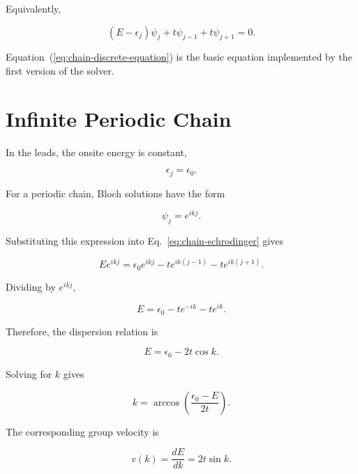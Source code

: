 Equivalently,

\begin{equation}
	(E-\epsilon_j)\psi_j
	+
	t\psi_{j-1}
	+
	t\psi_{j+1}
	=
	0.
	\label{eq:chain-discrete-equation}
\end{equation}

Equation~(\ref{eq:chain-discrete-equation}) is the basic equation
implemented by the first version of the solver.

\section{Infinite Periodic Chain}

In the leads, the onsite energy is constant,

\begin{equation}
	\epsilon_j=\epsilon_0.
\end{equation}

For a periodic chain, Bloch solutions have the form

\begin{equation}
	\psi_j = e^{ikj}.
\end{equation}

Substituting this expression into Eq.~\eqref{eq:chain-schrodinger}
gives

\begin{equation}
	E e^{ikj}
	=
	\epsilon_0 e^{ikj}
	-
	t e^{ik(j-1)}
	-
	t e^{ik(j+1)}.
\end{equation}

Dividing by $e^{ikj}$,

\begin{equation}
	E
	=
	\epsilon_0
	-
	t e^{-ik}
	-
	t e^{ik}.
\end{equation}

Therefore, the dispersion relation is

\begin{equation}
	E
	=
	\epsilon_0
	-
	2t\cos k.
	\label{eq:chain-dispersion}
\end{equation}

Solving for $k$ gives

\begin{equation}
	k
	=
	\arccos
	\left(
	\frac{\epsilon_0-E}{2t}
	\right).
	\label{eq:chain-wave-number}
\end{equation}

The corresponding group velocity is

\begin{equation}
	v(k)
	=
	\frac{dE}{dk}
	=
	2t\sin k.
	\label{eq:chain-group-velocity}
\end{equation}

